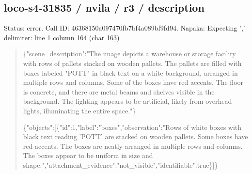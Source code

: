 \documentclass[10pt,a4paper]{article}
\begin{document}
\subsection*{loco-s4-31835 / nvila / r3 / description}
Status: error. Call ID: 46368150a097470fb7bf4a089bf9fd94. Napaka: Expecting ',' delimiter: line 1 column 164 (char 163)
\begin{quote}\footnotesize
\{"scene\_description":\allowbreak{}"The image depicts a warehouse or storage facility with rows of pallets stacked on wooden pallets. The pallets are filled with boxes labeled "POTT" in black text on a white background,\allowbreak{} arranged in multiple rows and columns. Some of the boxes have red accents. The floor is concrete,\allowbreak{} and there are metal beams and shelves visible in the background. The lighting appears to be artificial,\allowbreak{} likely from overhead lights,\allowbreak{} illuminating the entire space."\}\par
\par
\{"objects":\allowbreak{}[\{"id":\allowbreak{}1,\allowbreak{}"label":\allowbreak{}"box\allowbreak{}es",\allowbreak{}"observation":\allowbreak{}"Rows of white boxes with black text reading 'POTT' are stacked on wooden pallets. Some boxes have red accents. The boxes are neatly arranged in multiple rows and columns. The boxes appear to be uniform in size and shape.",\allowbreak{}"attachment\_evidence":\allowbreak{}"n\allowbreak{}ot\_visible",\allowbreak{}"identifiable":\allowbreak{}true\}\allowbreak{}]\}
\end{quote}
\end{document}

